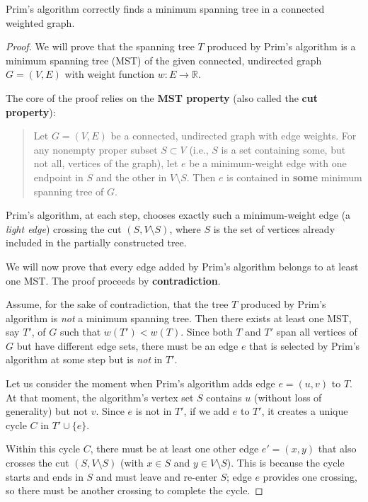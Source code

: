 \documentclass[oneside]{book}
\begin{document}
\begin{theorem}
Prim's algorithm correctly finds a minimum spanning tree in a connected weighted graph.
\end{theorem}

\begin{proof}
We will prove that the spanning tree $T$ produced by Prim's algorithm is a minimum spanning tree (MST) of the given connected, undirected graph $G=(V,E)$ with weight function $w: E \rightarrow \mathbb{R}$.

The core of the proof relies on the \textbf{MST property} (also called the \textbf{cut property}):
\begin{quote}
Let $G=(V,E)$ be a connected, undirected graph with edge weights. For any nonempty proper subset $S \subset V$ (i.e., $S$ is a set containing some, but not all, vertices of the graph), let $e$ be a minimum-weight edge with one endpoint in $S$ and the other in $V \setminus S$. Then $e$ is contained in \textbf{some} minimum spanning tree of $G$.
\end{quote}
Prim's algorithm, at each step, chooses exactly such a minimum-weight edge (a \emph{light edge}) crossing the cut $(S, V \setminus S)$, where $S$ is the set of vertices already included in the partially constructed tree.

We will now prove that every edge added by Prim's algorithm belongs to at least one MST. The proof proceeds by \textbf{contradiction}.

Assume, for the sake of contradiction, that the tree $T$ produced by Prim's algorithm is \emph{not} a minimum spanning tree. Then there exists at least one MST, say $T'$, of $G$ such that $w(T') < w(T)$. Since both $T$ and $T'$ span all vertices of $G$ but have different edge sets, there must be an edge $e$ that is selected by Prim's algorithm at some step but is \emph{not} in $T'$.

Let us consider the moment when Prim's algorithm adds edge $e = (u,v)$ to $T$. At that moment, the algorithm's vertex set $S$ contains $u$ (without loss of generality) but not $v$. Since $e$ is not in $T'$, if we add $e$ to $T'$, it creates a unique cycle $C$ in $T' \cup \{e\}$.

Within this cycle $C$, there must be at least one other edge $e' = (x,y)$ that also crosses the cut $(S, V \setminus S)$ (with $x \in S$ and $y \in V \setminus S$). This is because the cycle starts and ends in $S$ and must leave and re-enter $S$; edge $e$ provides one crossing, so there must be another crossing to complete the cycle.


\end{proof}
\end{document}
